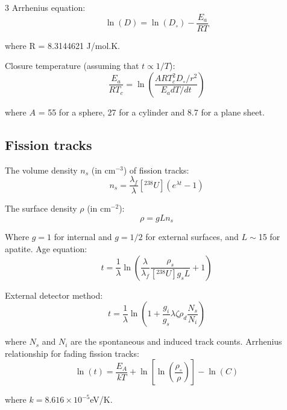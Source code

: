 \documentclass{article}
\begin{document}
\begin{multicols}{3}
Arrhenius equation:
\begin{equation}
\ln(D) = \ln(D_\circ) - \frac{E_a}{RT}
\label{eq:logD}
\end{equation}

where R = 8.3144621 J/mol.K.\medskip

Closure temperature (assuming that $t \propto 1/T$):
\begin{equation}
\frac{E_a}{RT_c} = \ln\left(\frac{ART_c^2D_\circ/r^2}{E_adT/dt}\right)
\label{eq:Tc}
\end{equation}

where $A$ = 55 for a sphere, 27 for a cylinder and 8.7 for a plane
sheet.

\subsection{Fission tracks}
\label{sec:fission-tracks}

The volume density $n_s$ (in cm$^{-3}$) of fission tracks:
\begin{equation}
n_{s} = \frac{\lambda_f}{\lambda} [^{238}U] \left(e^{\lambda t}-1\right)
\label{eq:Ns}
\end{equation}

The surface density $\rho$ (in cm$^{-2}$):
\begin{equation}
\rho = g L n_s
\label{eq:rhos}
\end{equation}

Where $g=1$ for internal and $g=1/2$ for external surfaces, and
$L\sim$15 for apatite. Age equation:
\begin{equation}
t = \frac{1}{\lambda}
\ln\left(\frac{\lambda}{\lambda_f}\frac{\rho_s}{[^{238}U] g_s L
}+1\right)
\label{eq:tFT}
\end{equation}

External detector method:
\begin{equation}
t =
\frac{1}{\lambda}\ln\left(1+\frac{g_i}{g_s}\lambda\zeta\rho_d\frac{N_s}{N_i}\right)
\label{eq:tzeta}
\end{equation}

\noindent where $N_s$ and $N_i$ are the spontaneous and induced track
counts. Arrhenius relationship for fading fission tracks:
\begin{equation}
\ln(t) = \frac{E_A}{kT} +
\ln\left[\ln\left(\frac{\rho_\circ}{\rho}\right)\right] - \ln(C)
\label{eq:lnt}
\end{equation}

where $k=8.616\times{10}^{-5}$eV/K.


\end{multicols}
\end{document}
